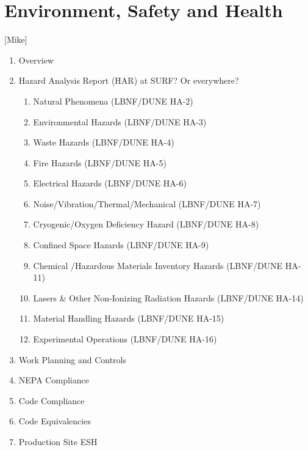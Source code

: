 \chapter{Environment, Safety and Health}
\label{vl:tc-ESH}

[Mike]

\begin{enumerate}
 \item Overview
 \item Hazard Analysis Report (HAR) at SURF? Or everywhere?
 \begin{enumerate}
   \item Natural Phenomena (LBNF/DUNE HA-2)
   \item Environmental Hazards (LBNF/DUNE HA-3)
   \item Waste Hazards (LBNF/DUNE HA-4)
   \item Fire Hazards (LBNF/DUNE HA-5)
   \item Electrical Hazards (LBNF/DUNE HA-6)
     \item Noise/Vibration/Thermal/Mechanical (LBNF/DUNE HA-7)
     \item Cryogenic/Oxygen Deficiency Hazard (LBNF/DUNE HA-8)
     \item Confined Space Hazards (LBNF/DUNE HA-9)
     \item Chemical /Hazardous Materials Inventory Hazards (LBNF/DUNE HA-11)
     \item Lasers \& Other Non-Ionizing Radiation Hazards (LBNF/DUNE HA-14)
     \item Material Handling Hazards (LBNF/DUNE HA-15)
     \item Experimental Operations (LBNF/DUNE HA-16)
 \end{enumerate}
 \item Work Planning and Controls
 \item NEPA Compliance
 \item Code Compliance
 \item Code Equivalencies
 \item Production Site ESH
\end{enumerate}
